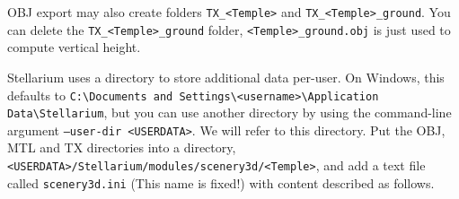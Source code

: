 \documentclass[a4paper]{article}
\newcommand{\cmd}[1]{\texttt{#1}}
\begin{document}
OBJ export may also create folders \verb|TX_<Temple>| and
\verb|TX_<Temple>_ground|. You can delete the \verb|TX_<Temple>_ground| folder, 
\verb|<Temple>_ground.obj| is just used to compute vertical height.

Stellarium uses a directory to store additional data per-user. On Windows, this defaults to 
\verb|C:\Documents and Settings\<username>\Application Data\Stellarium|, but you can use another directory by using the command-line argument 
\cmd{--user-dir <USERDATA>}. We will refer to this directory.
Put the OBJ, MTL and TX directories into a directory, \\
\verb|<USERDATA>/Stellarium/modules/scenery3d/<Temple>|, and add a text file
called \texttt{scenery3d.ini} (This name is fixed!) with content described as follows.

%
\end{document}
